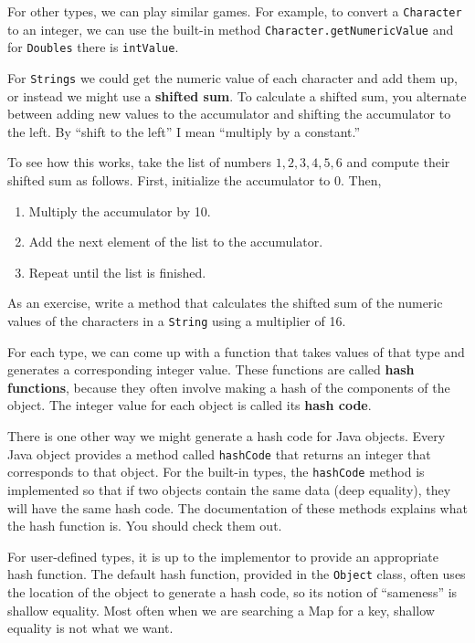 \documentclass[12pt]{book}
\theoremstyle{exercise}
\begin{document}
For other types, we can play similar games.  For example,
to convert a {\tt Character} to an integer, we can use
the built-in method {\tt Character.getNumericValue} and
for {\tt Doubles} there is {\tt intValue}.


For {\tt Strings} we could get the numeric value of each character and
add them up, or instead we might use a {\bf shifted sum}.  To
calculate a shifted sum, you alternate between adding new values to
the accumulator and shifting the accumulator to the left.  By ``shift
to the left'' I mean ``multiply by a constant.''

To see how this works, take the list of numbers
${ 1, 2, 3, 4, 5, 6 }$ and compute their shifted sum as
follows.  First, initialize the accumulator to 0.  Then,

\begin{enumerate}

\item Multiply the accumulator by 10.

\item Add the next element of the list to the accumulator.

\item Repeat until the list is finished.

\end{enumerate}

As an exercise, write a method that calculates the shifted sum
of the numeric values of the characters in a {\tt String} using
a multiplier of 16.

For each type, we can come up with a function that takes values of that
type and generates a corresponding integer value.  These
functions are called {\bf hash functions}, because they often
involve making a hash of the components of the object.  The
integer value for each object is called its {\bf hash code}.

There is one other way we might generate a hash code for Java objects.
Every Java object provides a method called {\tt hashCode} that returns
an integer that corresponds to that object.  For the built-in types,
the {\tt hashCode} method is implemented so that if two objects
contain the same data (deep equality), they will have the same hash
code.  The documentation of these methods explains what the hash
function is.  You should check them out.


For user-defined types, it is up to the implementor to provide
an appropriate hash function.  The default hash function, provided
in the {\tt Object} class, often uses the location of the
object to generate a hash code, so its notion of ``sameness''
is shallow equality.  Most often when we are searching a
Map for a key, shallow equality is not what we want.
\end{document}
